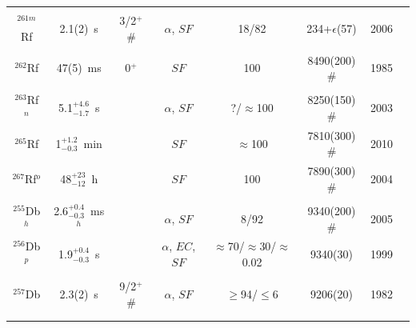\begin{center}
\begin{longtable}{c|ccccccl}
			&				&			&					&			& 				    &		&{\tiny\cite{Nishio2006,Morita2007,Sumita2013,Oganessian2024}}\\
$^{261m}$Rf	& 2.1(2)~s		&3/2$^+$\# 	&$\alpha$, $SF$		&18/82		&234+$\epsilon$(57)&2006	&{\tiny\cite{Dvorak2006,Dvorak2008,Gates2008,Duellmann2008,Haba2011,Haba2012}}\\
			&				&			&					&			& 				    &		&{\tiny\cite{Murakami2013,Nishio2006,Morita2007,Sumita2013,Oganessian2024}}\\
$^{262}$Rf	& 47(5)~ms		& 0$^+$		&$SF$				&100		&8490(200)$\#$	    &1985	&{\tiny\cite{Nitschke1978,Somerville1985,Lazarev1994a,Lane1996,Tuerler1998,Lazarev2000}}\\
			&				& 			&					&			&				    &   	&{\tiny\cite{Duellmann2008,Gorshkov2009,Hessberger2017,Hinde2018}}\\
$^{263}$Rf$^n$&5.1$^{+4.6}_{-1.7}$~s&	&$\alpha$, $SF$		&?/$\approx$100&8250(150)$\#$	&2003	&{\tiny\cite{Kratz1992,Kratz2003,Haba2020,Oganessian2024}}\\
$^{265}$Rf	& 1$^{+1.2}_{-0.3}$~min& 	&$SF$			   &$\approx$100&7810(300)$\#$	    &2010	&{\tiny\cite{Ellison2010,Utyonkov2015,Utyonkov2018}}\\
$^{267}$Rf$^o$& 48$^{+23}_{-12}$~h& 	&$SF$				&100		&7890(300)$\#$	    &2004	&{\tiny\cite{Oganessian2004a,Oganessian2007,Oganessian2011a,Oganessian2022b}}\\
\hline\\
$^{255}$Db$^h$& 2.6$^{+0.4}_{-0.3}$~ms$^h$& &$\alpha$, $SF$	&8/92		&9340(200)$\#$	    &2005	&{\tiny\cite{Flerov1976,Leppanen2005,Pore2024,Pore2024a}}\\
$^{256}$Db$^p$& 1.9$^{+0.4}_{-0.3}$~s& 	&$\alpha$, $EC$, $SF$	&$\approx$70/$\approx$30/$\approx$0.02&9340(30)&1999&{\tiny\cite{Hessberger1999,Hessberger1999a,Hessberger2001,Nelson2008,Lopez-Martens2019,Yeremin2019}}\\
			&				& 			&					&			&				    &		&{\tiny\cite{Kuznetsova2020,Pore2024}}\\
$^{257}$Db	& 2.3(2)~s		& 9/2$^+$\#	&$\alpha$, $SF$		&$\geq$94/$\leq$6&9206(20)		&1982	&{\tiny\cite{Oganessian1976,Hessberger1982,Hessberger1985,Andreyev1992,Hessberger1999,Hessberger1999a}}\\
			&				&			&					&			& 				    &		&{\tiny\cite{Gates2008a,Hessberger2009,Hessberger2010a,Ito2018,Lopez-Martens2019,Yeremin2019}}\\
			&				&			&					&			& 				    &		&{\tiny\cite{Kuznetsova2020,Schury2021,Iwase2023,ZhaoZ2024}}\\

\end{longtable}
\end{center}
